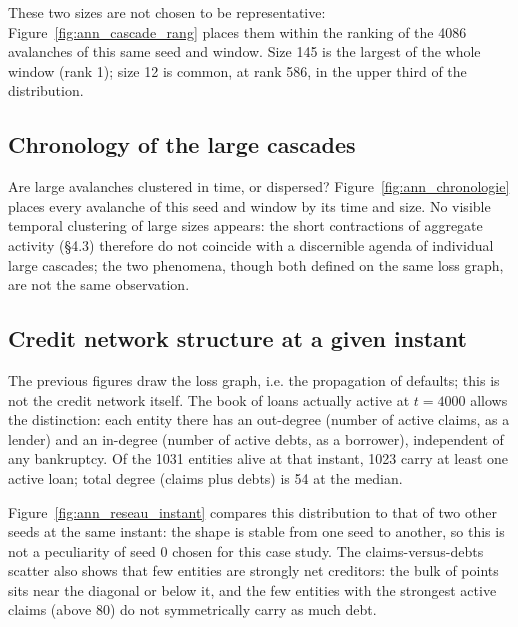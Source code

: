 These two sizes are not chosen to be representative: Figure~\ref{fig:ann_cascade_rang}
places them within the ranking of the 4086 avalanches of this same seed
and window. Size 145 is the largest of the whole window (rank 1); size
12 is common, at rank 586, in the upper third of the distribution.


\subsection{Chronology of the large cascades}
Are large avalanches clustered in time, or dispersed? Figure~\ref{fig:ann_chronologie}
places every avalanche of this seed and window by its time and size. No
visible temporal clustering of large sizes appears: the short
contractions of aggregate activity (\S4.3) therefore do not coincide
with a discernible agenda of individual large cascades; the two
phenomena, though both defined on the same loss graph, are not the same
observation.


\subsection{Credit network structure at a given instant}\label{sec:reseau_instant}
The previous figures draw the loss graph, i.e. the propagation of
defaults; this is not the credit network itself. The book of loans
actually active at $t=4000$ allows the distinction: each entity there
has an out-degree (number of active claims, as a lender) and an
in-degree (number of active debts, as a borrower), independent of any
bankruptcy. Of the 1031 entities alive at that instant, 1023 carry at
least one active loan; total degree (claims plus debts) is 54 at the
median.

Figure~\ref{fig:ann_reseau_instant} compares this distribution to that
of two other seeds at the same instant: the shape is stable from one
seed to another, so this is not a peculiarity of seed 0 chosen for this
case study. The claims-versus-debts scatter also shows that few
entities are strongly net creditors: the bulk of points sits near the
diagonal or below it, and the few entities with the strongest active
claims (above 80) do not symmetrically carry as much debt.


